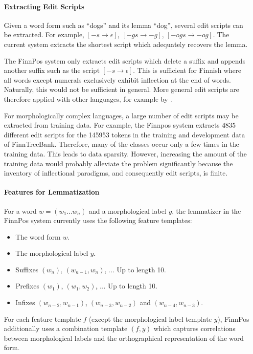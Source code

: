 \paragraph{Extracting Edit Scripts} Given a word form such as ``dogs''
and its lemma ``dog'', several edit scripts can be extracted. For
example, $[-s \rightarrow \epsilon]$, $[-gs \rightarrow -g]$, $[-ogs
\rightarrow -og]$. The current system extracts the shortest script
which adequately recovers the lemma. 

The FinnPos system only extracts edit scripts which delete a suffix
and appends another suffix such as the script $[-s \rightarrow
\epsilon]$. This is sufficient for Finnish where all words except
numerals exclusively exhibit inflection at the end of
words. Naturally, this would not be sufficient in general. More
general edit scripts are therefore applied with other languages, for
example by \cite{Chrupala2008}.

For morphologically complex languages, a large number of edit scripts
may be extracted from training data. For example, the Finnpos system
extracts 4835 different edit scripts for the 145953 tokens in the
training and development data of FinnTreeBank. Therefore, many of the
classes occur only a few times in the training data. This leads to data
sparsity. However, increasing the amount of the training data would
probably alleviate the problem significantly because the inventory of
inflectional paradigms, and consequently edit scripts, is finite.

\paragraph{Features for Lemmatization} For a word $w = (w_1...w_n)$ and
a morphological label $y$, the lemmatizer in the FinnPos system
currently uses the following feature templates:
\begin{itemize}
\item The word form $w$.
\item The morphological label $y$.
\item Suffixes $(w_n)$, $(w_{n-1},w_n)$, ... Up to length 10.
\item Prefixes $(w_1)$, $(w_1,w_2)$, ... Up to length 10.
\item Infixes $(w_{n-2},w_{n-1})$, $(w_{n-3},w_{n-2})$ and $(w_{n-4},w_{n-3})$.
\end{itemize}
For each feature template $f$ (except the morphological label template
$y$), FinnPos additionally uses a combination template $(f,y)$ which
captures correlations between morphological labels and the
orthographical representation of the word form.

